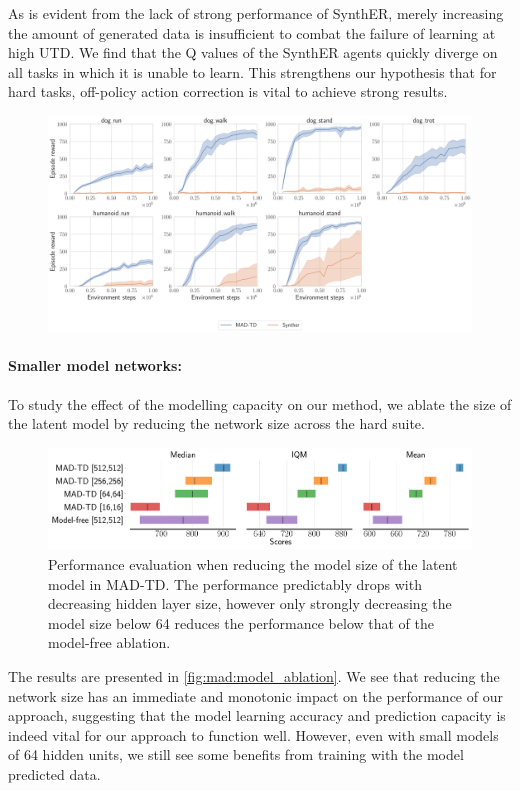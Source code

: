 As is evident from the lack of strong performance of SynthER, merely increasing the amount of generated data is insufficient to combat the failure of learning at high UTD.
We find that the Q values of the SynthER agents quickly diverge on all tasks in which it is unable to learn.
This strengthens our hypothesis that for hard tasks, off-policy action correction is vital to achieve strong results.

\begin{figure}[H]
    \centering
    \includegraphics[width=\linewidth]{figures/mad-td/hard_fs_1_synther.pdf}
    \caption{}
    \label{fig:mad:synther}
\end{figure}

\paragraph{Smaller model networks:}To study the effect of the modelling capacity on our method, we ablate the size of the latent model by reducing the network size across the hard suite.
\begin{figure}[b]
    \centering
    \includegraphics[width=1.0\linewidth]{figures/mad-td/model_ablation_rliable.pdf}
    \caption{Performance evaluation when reducing the model size of the latent model in MAD-TD. The performance predictably drops with decreasing hidden layer size, however only strongly decreasing the model size below 64 reduces the performance below that of the model-free ablation.}
    \label{fig:mad:model_ablation}
\end{figure}
The results are presented in \autoref{fig:mad:model_ablation}.
We see that reducing the network size has an immediate and monotonic impact on the performance of our approach, suggesting that the model learning accuracy and prediction capacity is indeed vital for our approach to function well.
However, even with small models of 64 hidden units, we still see some benefits from training with the model predicted data.

